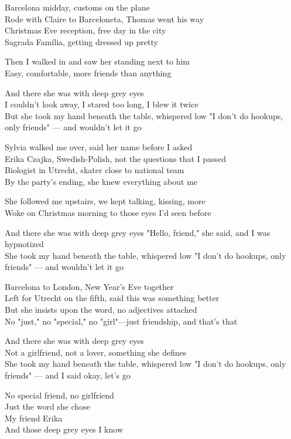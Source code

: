 \begin{lyrics}
Barcelona midday, customs on the plane\\
Rode with Claire to Barceloneta, Thomas went his way\\
Christmas Eve reception, free day in the city\\
Sagrada Família, getting dressed up pretty

Then I walked in and saw her standing next to him\\
Easy, comfortable, more friends than anything

And there she was with deep grey eyes\\
I couldn't look away, I stared too long, I blew it twice\\
But she took my hand beneath the table, whispered low
"I don't do hookups, only friends" — and wouldn't let it go

Sylvia walked me over, said her name before I asked\\
Erika Czajka, Swedish-Polish, not the questions that I passed\\
Biologist in Utrecht, skater close to national team\\
By the party's ending, she knew everything about me

She followed me upstairs, we kept talking, kissing, more\\
Woke on Christmas morning to those eyes I'd seen before

And there she was with deep grey eyes
"Hello, friend," she said, and I was hypnotized\\
She took my hand beneath the table, whispered low
"I don't do hookups, only friends" — and wouldn't let it go

Barcelona to London, New Year's Eve together\\
Left for Utrecht on the fifth, said this was something better\\
But she insists upon the word, no adjectives attached\\
No "just," no "special," no "girl"—just friendship, and that's that

And there she was with deep grey eyes\\
Not a girlfriend, not a lover, something she defines\\
She took my hand beneath the table, whispered low
"I don't do hookups, only friends" — and I said okay, let's go

No special friend, no girlfriend\\
Just the word she chose\\
My friend Erika\\
And those deep grey eyes I know
\end{lyrics}


